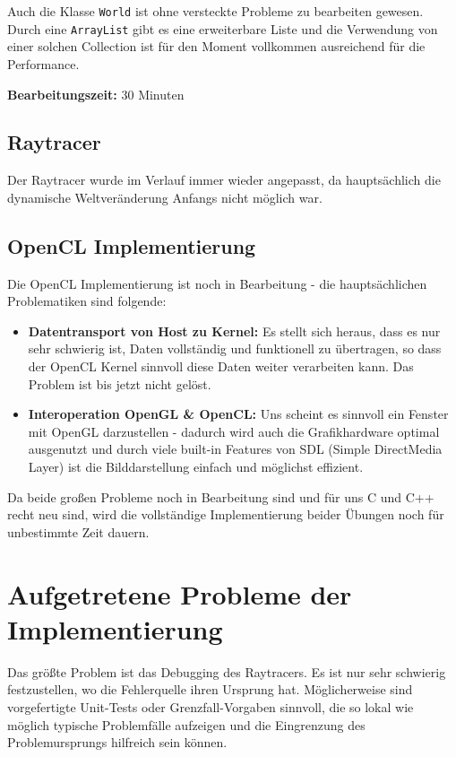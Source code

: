 \documentclass[tog]{acmsiggraph}
\newcommand{\code}[1]{\texttt{#1}}
\begin{document}
Auch die Klasse \code{World} ist ohne versteckte Probleme zu bearbeiten gewesen. Durch eine \code{ArrayList} gibt es eine erweiterbare Liste und die Verwendung von einer solchen Collection ist für den Moment vollkommen ausreichend für die Performance.

\textbf{Bearbeitungszeit:} 30 Minuten

\subsection{Raytracer}

Der Raytracer wurde im Verlauf immer wieder angepasst, da hauptsächlich die dynamische Weltveränderung Anfangs nicht möglich war.

\subsection{OpenCL Implementierung}

Die OpenCL Implementierung ist noch in Bearbeitung - die hauptsächlichen Problematiken sind folgende:

\begin{itemize}

\item \textbf{Datentransport von Host zu Kernel:} Es stellt sich heraus, dass es nur sehr schwierig ist, Daten vollständig und funktionell zu übertragen, so dass der OpenCL Kernel sinnvoll diese Daten weiter verarbeiten kann. Das Problem ist bis jetzt nicht gelöst.

\item \textbf{Interoperation OpenGL \& OpenCL:} Uns scheint es sinnvoll ein Fenster mit OpenGL darzustellen - dadurch wird auch die Grafikhardware optimal ausgenutzt und durch viele built-in Features von SDL (Simple DirectMedia Layer) ist die Bilddarstellung einfach und möglichst effizient.

\end{itemize}

Da beide großen Probleme noch in Bearbeitung sind und für uns C und C++ recht neu sind, wird die vollständige Implementierung beider Übungen noch für unbestimmte Zeit dauern.

\section{Aufgetretene Probleme der Implementierung}

Das größte Problem ist das Debugging des Raytracers. Es ist nur sehr schwierig festzustellen, wo die Fehlerquelle ihren Ursprung hat. Möglicherweise sind vorgefertigte Unit-Tests oder Grenzfall-Vorgaben sinnvoll, die so lokal wie möglich typische Problemfälle aufzeigen und die Eingrenzung des Problemursprungs hilfreich sein können.
\end{document}
